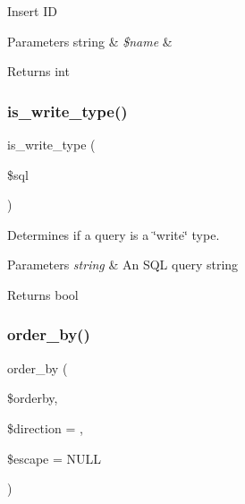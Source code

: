 Insert ID


\begin{DoxyParams}[1]{Parameters}
string & {\em \$name} & \\
\hline
\end{DoxyParams}
\begin{DoxyReturn}{Returns}
int 
\end{DoxyReturn}
\mbox{\label{class_c_i___d_b__pdo__pgsql__driver_af435df5703c238769d6d16fde6d51182}} 
\subsubsection{\texorpdfstring{is\+\_\+write\+\_\+type()}{is\_write\_type()}}
{\footnotesize\ttfamily is\+\_\+write\+\_\+type (\begin{DoxyParamCaption}\item[{}]{\$sql }\end{DoxyParamCaption})}

Determines if a query is a \char`\"{}write\char`\"{} type.


\begin{DoxyParams}{Parameters}
{\em string} & An S\+QL query string \\
\hline
\end{DoxyParams}
\begin{DoxyReturn}{Returns}
bool 
\end{DoxyReturn}
\mbox{\label{class_c_i___d_b__pdo__pgsql__driver_a6d1ce6a3b22187165ce7d710ce91841d}} 
\subsubsection{\texorpdfstring{order\+\_\+by()}{order\_by()}}
{\footnotesize\ttfamily order\+\_\+by (\begin{DoxyParamCaption}\item[{}]{\$orderby,  }\item[{}]{\$direction = {\ttfamily \textquotesingle{}\textquotesingle{}},  }\item[{}]{\$escape = {\ttfamily NULL} }\end{DoxyParamCaption})}

